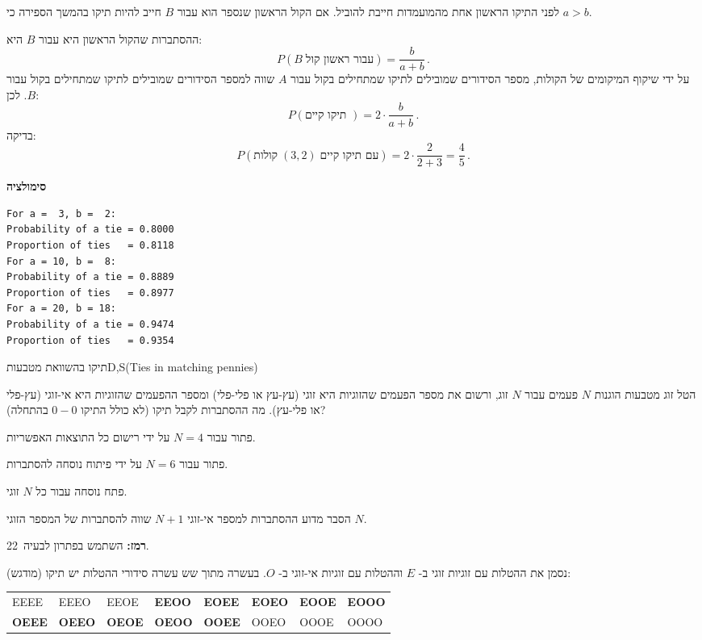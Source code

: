 לפני התיקו הראשון אחת מהמועמדות חייבת להוביל. אם הקול הראשון שנספר הוא עבור 
$B$
חייב להיות תיקו בהמשך הספירה כי
$a>b$.

ההסתברות שהקול הראשון היא עבור 
$B$
היא:
\[
P(B\;\textrm{עבור ראשון קול})=\frac{b}{a+b}\,.
\]
על ידי שיקוף המיקומים של הקולות, מספר הסידורים שמובילים לתיקו שמתחילים בקול עבור
$A$
שווה למספר הסידורים שמובילים לתיקו שמתחילים בקול עבור
$B$. 
לכן:
\[
P(\textrm{תיקו קיים })=2\cdot\frac{b}{a+b}\,.
\]
בדיקה:
\[
P(\textrm{קולות}\;(3,2)\;\textrm{עם תיקו קיים})=2\cdot\frac{2}{2+3}=\frac{4}{5}\,.
\]

\textbf{סימולציה}
\begin{verbatim}
For a =  3, b =  2:
Probability of a tie = 0.8000
Proportion of ties   = 0.8118
For a = 10, b =  8:
Probability of a tie = 0.8889
Proportion of ties   = 0.8977
For a = 20, b = 18:
Probability of a tie = 0.9474
Proportion of ties   = 0.9354
\end{verbatim}



\begin{prob}{תיקו בהשוואת מטבעות}{D,S}{(Ties in matching pennies)}

הטל זוג מטבעות הוגנות
$N$
פעמים עבור
$N$
זוג, ורשום את מספר הפעמים שהזוגיות היא זוגי (עץ-עץ או פלי-פלי) ומספר ההפעמים שהזוגיות היא אי-זוגי (עץ-פלי או פלי-עץ). מה ההסתברות לקבל תיקו (לא כולל התיקו 
$0-0$
בהתחלה)?

פתור עבור 
$N=4$
על ידי רישום כל התוצאות האפשריות.

פתור עבור
$N=6$
על ידי פיתוח נוסחה להסתברות.

פתח נוסחה עבור כל
$N$
זוגי.

הסבר מדוע ההסתברות למספר אי-זוגי
$N+1$
שווה להסתברות של המספר הזוגי
$N$.

\textbf{רמז:}
השתמש בפתרון לבעיה~22.
\end{prob}
\solution{}

נסמן את ההטלות עם זוגיות זוגי ב-%
$E$
וההטלות עם זוגיות אי-זוגי ב-%
$O$.
בעשרה מתוך שש עשרה סידורי ההטלות יש תיקו (מודגש):
\begin{center}
\begin{tabular}{llllllll}
EEEE & EEEO & EEOE & \textbf{EEOO} & \textbf{EOEE} & \textbf{EOEO} &\textbf{EOOE} & \textbf{EOOO}\\
\textbf{OEEE} & \textbf{OEEO} & \textbf{OEOE} & \textbf{OEOO} & \textbf{OOEE} & OOEO&OOOE & OOOO
\end{tabular}
\end{center}

